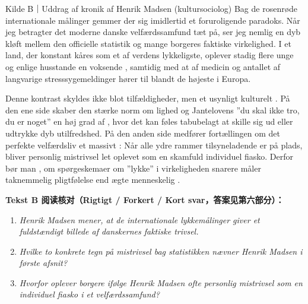 \begin{emailbox}{Kilde B｜Uddrag af kronik af Henrik Madsen (kultursociolog)}
Bag de rosenrøde internationale målinger gemmer der sig imidlertid et foruroligende paradoks. Når jeg betragter det moderne danske velfærdssamfund tæt på, ser jeg nemlig en dyb kløft mellem den officielle statistik og mange borgeres faktiske virkelighed. I et land, der konstant kåres som et af verdens lykkeligste, oplever stadig flere unge og enlige husstande en voksende , samtidig med at  af  medicin og antallet af langvarige stresssygemeldinger hører til blandt de højeste i Europa.

Denne kontrast skyldes ikke blot tilfældigheder, men et usynligt kulturelt . På den ene side skaber den stærke norm om lighed og Jantelovens ”du skal ikke tro, du er noget” en høj grad af , hvor det kan føles tabubelagt at skille sig ud eller udtrykke dyb utilfredshed. På den anden side medfører fortællingen om det perfekte velfærdsliv et massivt : Når alle ydre rammer tilsyneladende er på plads, bliver personlig mistrivsel let oplevet som en skamfuld individuel fiasko. Derfor bør man , om spørgeskemaer om ”lykke” i virkeligheden snarere måler taknemmelig pligtfølelse end ægte menneskelig .
\end{emailbox}

\textbf{Tekst B 阅读核对（Rigtigt / Forkert / Kort svar，答案见第六部分）：}
\begin{enumerate}
  \item \textit{Henrik Madsen mener, at de internationale lykkemålinger giver et fuldstændigt billede af danskernes faktiske trivsel.} \underline{\hspace{2.2cm}}
  \item \textit{Hvilke to konkrete tegn på mistrivsel bag statistikken nævner Henrik Madsen i første afsnit?} \underline{\hspace{2.2cm}}
  \item \textit{Hvorfor oplever borgere ifølge Henrik Madsen ofte personlig mistrivsel som en individuel fiasko i et velfærdssamfund?} \underline{\hspace{2.2cm}}
\end{enumerate}

